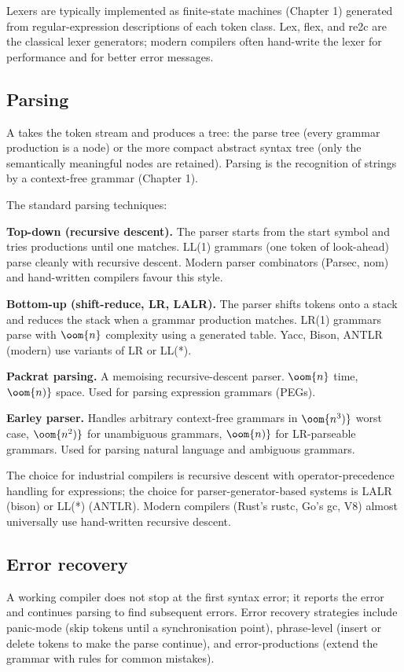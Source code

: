 Lexers are typically implemented as finite-state machines (Chapter 1) generated from regular-expression descriptions of each token class. Lex, flex, and re2c are the classical lexer generators; modern compilers often hand-write the lexer for performance and for better error messages.

\subsection{Parsing}

A  takes the token stream and produces a tree: the parse tree (every grammar production is a node) or the more compact abstract syntax tree (only the semantically meaningful nodes are retained). Parsing is the recognition of strings by a context-free grammar (Chapter 1).

The standard parsing techniques:

\textbf{Top-down (recursive descent).} The parser starts from the start symbol and tries productions until one matches. LL(1) grammars (one token of look-ahead) parse cleanly with recursive descent. Modern parser combinators (Parsec, nom) and hand-written compilers favour this style.

\textbf{Bottom-up (shift-reduce, LR, LALR).} The parser shifts tokens onto a stack and reduces the stack when a grammar production matches. LR(1) grammars parse with $\oom{n}$ complexity using a generated table. Yacc, Bison, ANTLR (modern) use variants of LR or LL(*).

\textbf{Packrat parsing.} A memoising recursive-descent parser. $\oom{n}$ time, $\oom{n)}$ space. Used for parsing expression grammars (PEGs).

\textbf{Earley parser.} Handles arbitrary context-free grammars in $\oom{n^3)}$ worst case, $\oom{n^2)}$ for unambiguous grammars, $\oom{n)}$ for LR-parseable grammars. Used for parsing natural language and ambiguous grammars.

The choice for industrial compilers is recursive descent with operator-precedence handling for expressions; the choice for parser-generator-based systems is LALR (bison) or LL(*) (ANTLR). Modern compilers (Rust's rustc, Go's gc, V8) almost universally use hand-written recursive descent.

\subsection{Error recovery}

A working compiler does not stop at the first syntax error; it reports the error and continues parsing to find subsequent errors. Error recovery strategies include panic-mode (skip tokens until a synchronisation point), phrase-level (insert or delete tokens to make the parse continue), and error-productions (extend the grammar with rules for common mistakes).

